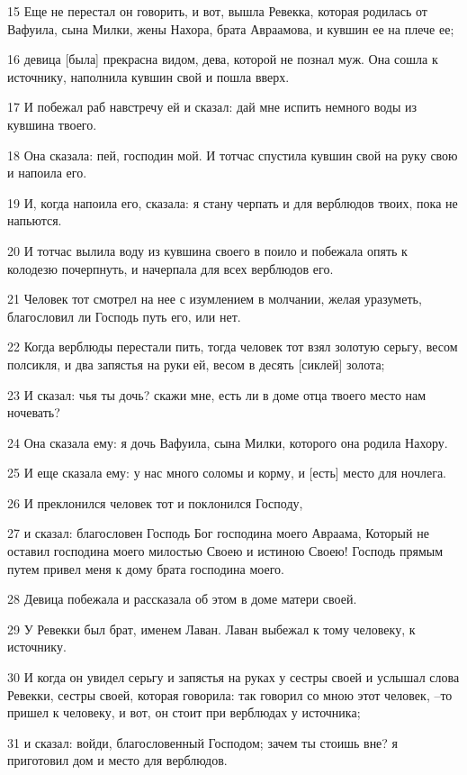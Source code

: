 \par 15 Еще не перестал он говорить, и вот, вышла Ревекка, которая родилась от Вафуила, сына Милки, жены Нахора, брата Авраамова, и кувшин ее на плече ее;
\par 16 девица [была] прекрасна видом, дева, которой не познал муж. Она сошла к источнику, наполнила кувшин свой и пошла вверх.
\par 17 И побежал раб навстречу ей и сказал: дай мне испить немного воды из кувшина твоего.
\par 18 Она сказала: пей, господин мой. И тотчас спустила кувшин свой на руку свою и напоила его.
\par 19 И, когда напоила его, сказала: я стану черпать и для верблюдов твоих, пока не напьются.
\par 20 И тотчас вылила воду из кувшина своего в поило и побежала опять к колодезю почерпнуть, и начерпала для всех верблюдов его.
\par 21 Человек тот смотрел на нее с изумлением в молчании, желая уразуметь, благословил ли Господь путь его, или нет.
\par 22 Когда верблюды перестали пить, тогда человек тот взял золотую серьгу, весом полсикля, и два запястья на руки ей, весом в десять [сиклей] золота;
\par 23 И сказал: чья ты дочь? скажи мне, есть ли в доме отца твоего место нам ночевать?
\par 24 Она сказала ему: я дочь Вафуила, сына Милки, которого она родила Нахору.
\par 25 И еще сказала ему: у нас много соломы и корму, и [есть] место для ночлега.
\par 26 И преклонился человек тот и поклонился Господу,
\par 27 и сказал: благословен Господь Бог господина моего Авраама, Который не оставил господина моего милостью Своею и истиною Своею! Господь прямым путем привел меня к дому брата господина моего.
\par 28 Девица побежала и рассказала об этом в доме матери своей.
\par 29 У Ревекки был брат, именем Лаван. Лаван выбежал к тому человеку, к источнику.
\par 30 И когда он увидел серьгу и запястья на руках у сестры своей и услышал слова Ревекки, сестры своей, которая говорила: так говорил со мною этот человек, --то пришел к человеку, и вот, он стоит при верблюдах у источника;
\par 31 и сказал: войди, благословенный Господом; зачем ты стоишь вне? я приготовил дом и место для верблюдов.
